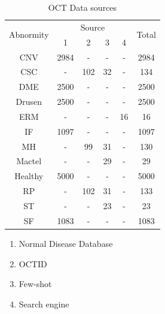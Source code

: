 \documentclass{article}
\begin{document}
	\vspace{-0.5cm}
	\begin{minipage}[t]{0.4\linewidth}
		{
			\fontsize{9}{12}\selectfont
			{
				\begin{longtable}{cccccc}
					\caption{OCT Data sources}
					\label{tb:OCT_source}\\
					\toprule
					\multirow{2}{*}{Abnormity}&\multicolumn{4}{c}{Source}&\multirow{2}{*}{Total}\\
					&1&2&3&4&\\
					\midrule
					CNV    &2984&-  &- &- &2984\\
					CSC    &-   &102&32&- &134 \\
					DME    &2500&-  &- &- &2500\\
					Drusen &2500&-  &- &- &2500\\
					ERM    &-   &-  &- &16&16  \\
					IF     &1097&-  &- &- &1097\\
					MH     &-   &99 &31&- &130 \\
					Mactel &-   &-  &29&- &29  \\
					Healthy&5000&-  &- &- &5000\\
					RP     &-   &102&31&- &133 \\
					ST     &-   &-  &23&- &23  \\
					SF     &1083&-  &- &- &1083\\
					\bottomrule
				\end{longtable}
				
				\vspace{0.5cm}
				\begin{enumerate}
					\item Normal Disease Database \autocite{Kermany_database}
					\vspace{-0.2cm}
					
					\item OCTID \autocite{Gholami_Roy_Parthasarathy_Lakshminarayanan_2020}
					\vspace{-0.2cm}
					
					\item Few-shot \autocite{Yoo_2020}
					\vspace{-0.2cm}
					
					\item Search engine
					\vspace{-0.2cm}
				\end{enumerate}
				
				\vspace{0.5cm}
			}
		}
	\end{minipage}
\end{document}
